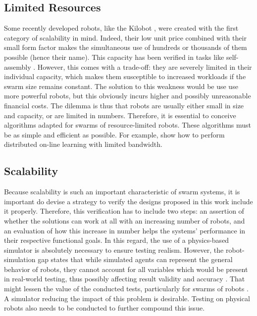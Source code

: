 \subsection{Limited Resources}
Some recently developed robots, like the Kilobot \cite{rubenstein2012kilobot}, were created with the first category of scalability in mind. Indeed, their low unit price combined with their small form factor makes the simultaneous use of hundreds or thousands of them possible (hence their name). This capacity has been verified in tasks like self-assembly \cite{rubenstein2014programmable}. However, this comes with a trade-off: they are severely limited in their individual capacity, which makes them susceptible to increased workloads if the swarm size remains constant. The solution to this weakness would be use use more powerful robots, but this obviously incurs higher and possibly unreasonable financial costs. The dilemma is thus that robots are usually either small in size and capacity, or are limited in numbers. Therefore, it is essential to conceive algorithms adapted for swarms of resource-limited robots. These algorithms must be as simple and efficient as possible. For example, \cite{fontbonne2020distributed} show how to perform distributed on-line learning with limited bandwidth.

\subsection{Scalability}
Because scalability is such an important characteristic of swarm systems, it is important do devise a strategy to verify the designs proposed in this work include it properly. Therefore, this verification has to include two steps: an assertion of whether the solutions can work at all with an increasing number of robots, and an evaluation of how this increase in number helps the systems' performance in their respective functional goals. In this regard, the use of a physics-based simulator is absolutely necessary to ensure testing realism. However, the robot-simulation gap states that while simulated agents can represent the general behavior of robots, they cannot account for all variables which would be present in real-world testing, thus possibly affecting result validity and accuracy  \cite{jakobi1995noise}. That might lessen the value of the conducted tests, particularly for swarms of robots \cite{francesca2016automatic}. A simulator reducing the impact of this problem is desirable. Testing on physical robots also needs to be conducted to further compound this issue.


